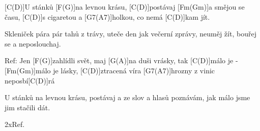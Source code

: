 
[C(D)]U stánků [F(G)]na levnou krásu, 
[C(D)]postávaj [Fm(Gm)]a smějou se času,
[C(D)]s cigaretou a [G7(A7)]holkou, co nemá [C(D)]kam jít.

Skleniček pára pár tahů z trávy, 
uteče den jak večerní zprávy,
neuměj žít, bouřej se a neposlouchaj.

Ref:
Jen [F(G)]zahlídli svět, maj [G(A)]na duši vrásky,
tak [C(D)]málo je - [Fm(Gm)]málo je lásky,
[C(D)]ztracená víra [G7(A7)]hrozny z vinic neposbí[C(D)]rá

U stánků na levnou krásu, 
postávaj a ze slov a hlasů
poznávám, jak málo jsme jim stačili dát.

2xRef.